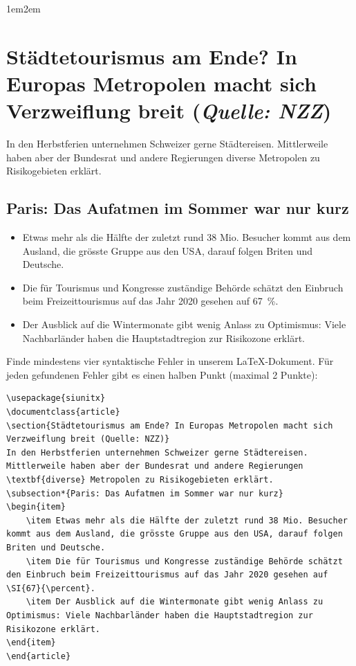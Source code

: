 \begin{questions}
\begin{adjustwidth}{1em}{2em}
\section*{Städtetourismus am Ende? In Europas Metropolen macht sich Verzweiflung breit (\textit{Quelle: NZZ})}
In den Herbstferien unternehmen Schweizer gerne Städtereisen. Mittlerweile haben aber der Bundesrat und andere Regierungen diverse Metropolen zu Risikogebieten erklärt.
\subsection*{Paris: Das Aufatmen im Sommer war nur kurz}
\begin{itemize}
    \item Etwas mehr als die Hälfte der zuletzt rund 38 Mio. Besucher kommt aus dem Ausland, die grösste Gruppe aus den USA, darauf folgen Briten und Deutsche.
    \item Die für Tourismus und Kongresse zuständige Behörde schätzt den Einbruch beim Freizeittourismus auf das Jahr 2020 gesehen auf \SI{67}{\percent}.
    \item Der Ausblick auf die Wintermonate gibt wenig Anlass zu Optimismus: Viele Nachbarländer haben die Hauptstadtregion zur Risikozone erklärt. 
\end{itemize}
\end{adjustwidth}
Finde mindestens vier syntaktische Fehler in unserem \LaTeX-Dokument. Für jeden gefundenen Fehler gibt es einen halben Punkt (maximal 2 Punkte):
\begin{lstlisting}[style=LaTeX]
\usepackage{siunitx}
\documentclass{article}
\section{Städtetourismus am Ende? In Europas Metropolen macht sich Verzweiflung breit (Quelle: NZZ)}
In den Herbstferien unternehmen Schweizer gerne Städtereisen. Mittlerweile haben aber der Bundesrat und andere Regierungen \textbf{diverse} Metropolen zu Risikogebieten erklärt.
\subsection*{Paris: Das Aufatmen im Sommer war nur kurz}
\begin{item}
    \item Etwas mehr als die Hälfte der zuletzt rund 38 Mio. Besucher kommt aus dem Ausland, die grösste Gruppe aus den USA, darauf folgen Briten und Deutsche.
    \item Die für Tourismus und Kongresse zuständige Behörde schätzt den Einbruch beim Freizeittourismus auf das Jahr 2020 gesehen auf \SI{67}{\percent}.
    \item Der Ausblick auf die Wintermonate gibt wenig Anlass zu Optimismus: Viele Nachbarländer haben die Hauptstadtregion zur Risikozone erklärt. 
\end{item}
\end{article}
\end{lstlisting}


\end{questions}
